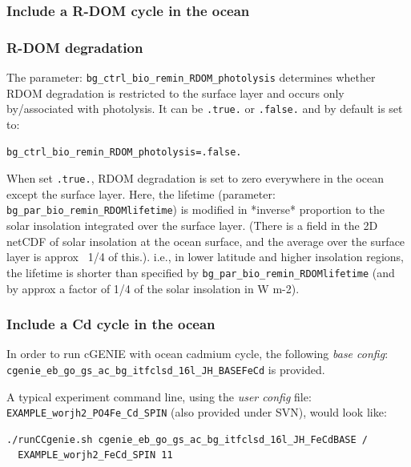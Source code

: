 \documentclass[11pt,fleqn]{book} %
\begin{document}
%
\subsubsection{Include a R-DOM cycle in the ocean}
\vspace{1mm}

\subsubsection{R-DOM degradation}

The parameter: \texttt{bg\_ctrl\_bio\_remin\_RDOM\_photolysis} determines whether RDOM degradation is restricted to the surface layer and occurs only by/associated with photolysis. It can be \texttt{.true.} or \texttt{.false.} and by default is set to:
\vspace{-2pt}\begin{verbatim}
bg_ctrl_bio_remin_RDOM_photolysis=.false.
\end{verbatim}\vspace{-2pt}
When set \texttt{.true.}, RDOM degradation is set to zero everywhere in the ocean except the surface layer. Here, the lifetime (parameter: \texttt{bg\_par\_bio\_remin\_RDOMlifetime}) is modified in *inverse* proportion to the solar insolation integrated over the surface layer. (There is a field in the 2D netCDF of solar insolation at the ocean surface, and the average over the surface layer is approx ~1/4 of this.). i.e., in lower latitude and higher insolation regions, the lifetime is shorter than specified by \texttt{bg\_par\_bio\_remin\_RDOMlifetime} (and by approx a factor of 1/4 of the solar insolation in W m-2).

%
\subsubsection{Include a Cd cycle in the ocean}
\vspace{1mm}

In order to run cGENIE with ocean cadmium cycle, the following \textit{base config}: \\ \texttt{cgenie\_eb\_go\_gs\_ac\_bg\_itfclsd\_16l\_JH\_BASEFeCd} is provided.

A typical experiment command line, using the \textit{user config} file: \texttt{EXAMPLE\_worjh2\_PO4Fe\_Cd\_SPIN} (also provided under SVN), would look like:
\vspace{-5.1mm}\begin{verbatim}
./runCCgenie.sh cgenie_eb_go_gs_ac_bg_itfclsd_16l_JH_FeCdBASE /
  EXAMPLE_worjh2_FeCd_SPIN 11
\end{verbatim}\vspace{-5.1mm}
\end{document}

